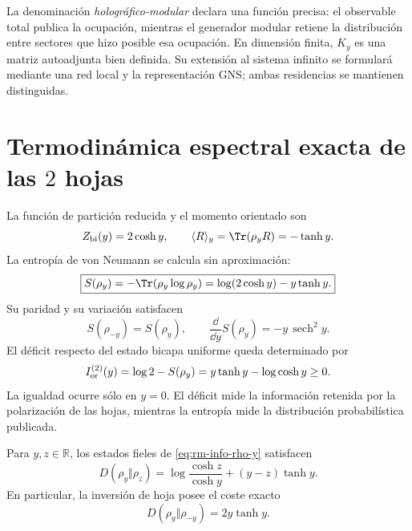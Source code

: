 La denominaci\'on \emph{hologr\'afico-modular} declara una funci\'on precisa:
el observable total publica la ocupaci\'on, mientras el generador modular
retiene la distribuci\'on entre sectores que hizo posible esa ocupaci\'on. En
dimensi\'on finita, \(K_y\) es una matriz autoadjunta bien definida. Su
extensi\'on al sistema infinito se formular\'a mediante una red local y la
representaci\'on GNS; ambas residencias se mantienen distinguidas.

\section{Termodinámica espectral exacta de las \(2\) hojas}

La funci\'on de partici\'on reducida y el momento orientado son
\begin{equation}
 Z_{\rm bi}(y)=2\cosh y,
 \qquad
 \langle R\rangle_y=\Tr(\rho_yR)=-\tanh y.
 \label{eq:rm-info-particion-momento}
\end{equation}
La entrop\'ia de von Neumann se calcula sin aproximaci\'on:
\begin{equation}
 \boxed{
 S(\rho_y)
 =-\Tr(\rho_y\log\rho_y)
 =\log(2\cosh y)-y\tanh y.}
 \label{eq:rm-info-entropia-bicapa}
\end{equation}
Su paridad y su variaci\'on satisfacen
\begin{equation}
 S(\rho_{-y})=S(\rho_y),
 \qquad
 \frac{\dd}{\dd y}S(\rho_y)=-y\,\operatorname{sech}^2y.
 \label{eq:rm-info-paridad-entropia}
\end{equation}
El d\'eficit respecto del estado bicapa uniforme queda determinado por
\begin{equation}
 I_{\rm or}^{(2)}(y)
 =\log2-S(\rho_y)
 =y\tanh y-\log\cosh y
 \geq0.
 \label{eq:rm-info-deficit-orientado}
\end{equation}
La igualdad ocurre s\'olo en \(y=0\). El d\'eficit mide la informaci\'on
retenida por la polarizaci\'on de las hojas, mientras la entrop\'ia mide la
distribuci\'on probabil\'istica publicada.

\begin{theorem}
\label{thm:rm-info-relative-general}
Para \(y,z\in\mathbb R\), los estados fieles de
\cref{eq:rm-info-rho-y} satisfacen
\begin{equation}
 \boxed{
 D(\rho_y\Vert\rho_z)
 =\log\frac{\cosh z}{\cosh y}
 +(y-z)\tanh y.}
 \label{eq:rm-info-relative-general}
\end{equation}
En particular, la inversi\'on de hoja posee el coste exacto
\begin{equation}
 \boxed{
 D(\rho_y\Vert\rho_{-y})=2y\tanh y.}
 \label{eq:rm-info-relative-inversion}
\end{equation}
\end{theorem}


